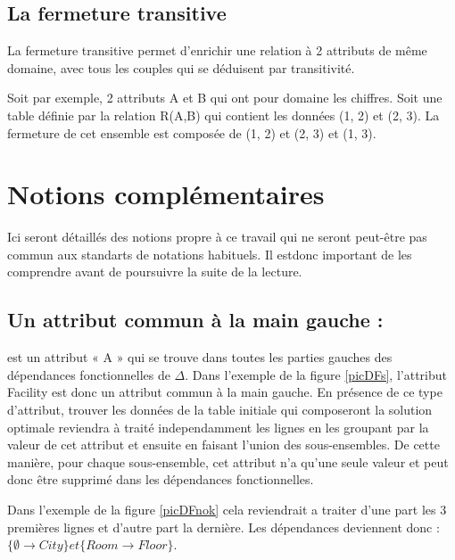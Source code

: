 \documentclass[12pt, a4paper, oneside, titlepage]{book}%
\begin{document}
\subsection{La fermeture transitive}
La fermeture transitive permet d'enrichir une relation à 2 attributs de même domaine, avec tous les couples qui se déduisent par transitivité.

Soit par exemple, 2 attributs A et B qui ont pour domaine les chiffres.
Soit une table définie par la relation R(A,B) qui contient les données (1, 2) et (2, 3). La fermeture de cet ensemble est composée de (1, 2) et (2, 3) et (1, 3).

\clearpage

\section{Notions complémentaires}\label{SECcomplement}
Ici seront détaillés des notions propre à ce travail qui ne seront peut-être pas commun aux standarts de notations habituels. Il estdonc important de les comprendre avant de poursuivre la suite de la lecture.

\subsection{Un attribut commun à la main gauche : } 
est un attribut « A » qui se trouve dans toutes les parties gauches des dépendances fonctionnelles de $\Delta$. Dans l'exemple de la figure \ref{picDFs}, l'attribut \fg Facility \og est donc un attribut commun à la main gauche. En présence de ce type d'attribut, trouver les données de la table initiale qui composeront la solution optimale reviendra à traité independamment les lignes en les groupant par la valeur de cet attribut et ensuite en faisant l'union des sous-ensembles.  De cette manière, pour chaque sous-ensemble, cet attribut n'a qu'une seule valeur et peut donc être supprimé dans les dépendances fonctionnelles.

Dans l'exemple de la figure \ref{picDFnok} cela reviendrait a traiter d'une part les 3 premières lignes et d'autre part la dernière. Les dépendances deviennent donc : $\{ \emptyset \rightarrow City \} et \{  Room \rightarrow Floor \}$.
\end{document}
